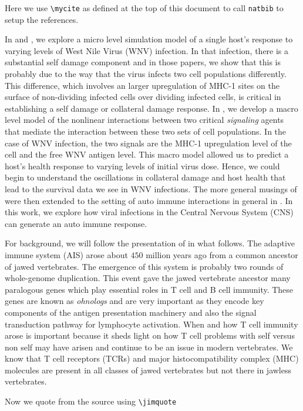 \documentclass[11pt]{SelfArxOneColBMN}
\begin{document}
\noindent
Here we use \verb+\mycite+ as defined at the top of this document
to call \verb+natbib+ to setup the references.

In  and , we explore a micro
level simulation model of a single host's response to varying levels of
West Nile Virus (WNV) infection.  In that infection, there is a substantial
self damage component and in those papers, we show that
this is probably due to the way that the virus infects two
cell populations differently.  This difference, which involves
an larger upregulation of MHC-1 sites on the surface
of non-dividing infected cells over dividing infected cells,
is critical in establishing a self damage or collateral damage response.
In , we develop a macro level model
of the nonlinear interactions between two critical \emph{signaling}
agents that mediate the interaction between these two sets of cell populations.
In the case of WNV infection, the two signals are the MHC-1 upregulation level
of the cell and the free WNV antigen level.  This macro model allowed
us to predict a host's health response to varying levels of initial virus dose.
Hence, we could begin to understand the oscillations in collateral damage
and host health that lead to the survival data we see in WNV infections.
The more general musings of  were then 
extended to the setting of auto immune interactions in general
in .  In this work, we explore how viral infections
in the Central Nervous System (CNS) can generate an auto immune
response.

For background, we will follow the presentation of 
in what follows.
The adaptive immune system (AIS) arose about $450$ million years ago
from a common ancestor of jawed vertebrates.  The emergence of this system
is probably two rounds of whole-genome duplication.  This event gave the jawed
vertebrate ancestor many paralogous genes which play essential roles
in T cell and B cell immunity.  These genes are known as \emph{ohnologs}
and are very important as they encode key components of the antigen
presentation machinery and also the signal transduction pathway for
lymphocyte activation.  When and how T cell immunity arose is important
because it sheds light on how T cell problems with self versus non self may have arisen
and continue to be an issue in modern vertebrates.  We know that
T cell receptors (TCRs) and major histocompatibility complex (MHC) molecules
are present in all classes of jawed vertebrates but not there in jawless vertebrates.

Now we quote from the source  using \verb+\jimquote+


		
\end{document}
